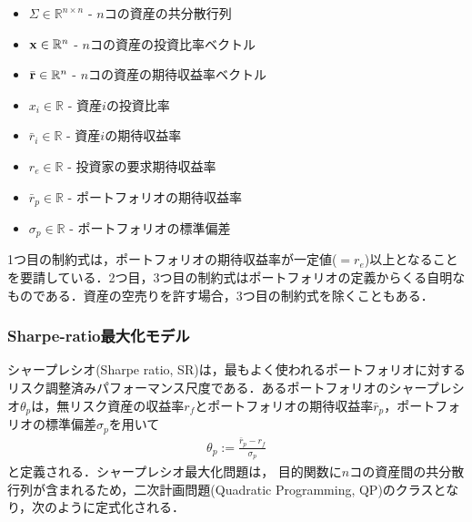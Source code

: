                                 \begin{itemize}
                                    \item $\Sigma \in \mathbb{R}^{n \times n}$ - $n$コの資産の共分散行列
                                        \item ${\bf x} \in \mathbb{R}^{n}$ - $n$コの資産の投資比率ベクトル
                                            \item $\bar{\bf r} \in \mathbb{R}^{n}$ - $n$コの資産の期待収益率ベクトル
                                                \item $x_i \in \mathbb{R}$ - 資産$i$の投資比率
                                                    \item $\bar{r}_i \in \mathbb{R}$ - 資産$i$の期待収益率
                                                        \item $r_e \in \mathbb{R}$ - 投資家の要求期待収益率
                                                            \item $\bar{r}_p \in \mathbb{R}$ - ポートフォリオの期待収益率
                                                                \item $\sigma_p \in \mathbb{R}$ - ポートフォリオの標準偏差
                                                                \end{itemize}
                                                                1つ目の制約式は，ポートフォリオの期待収益率が一定値($=r_e$)以上となることを要請している．2つ目，3つ目の制約式はポートフォリオの定義からくる自明なものである．資産の空売りを許す場合，3つ目の制約式を除くこともある．

                                                                \subsubsection{Sharpe-ratio最大化モデル}

                                                                シャープレシオ(Sharpe ratio, SR)は，最もよく使われるポートフォリオに対するリスク調整済みパフォーマンス尺度である．あるポートフォリオのシャープレシオ${\theta}_p$は，無リスク資産の収益率$r_f$とポートフォリオの期待収益率$\bar{r}_p$，ポートフォリオの標準偏差$\sigma_p$を用いて
                                                                \begin{align}
                                                                    {\theta}_p := \frac{\bar{r}_p - r_f}{\sigma_p}
                                                                    \end{align}
                                                                    と定義される．シャープレシオ最大化問題は，
                                                                    目的関数に$n$コの資産間の共分散行列が含まれるため，二次計画問題(Quadratic Programming, QP)のクラスとなり，次のように定式化される．

